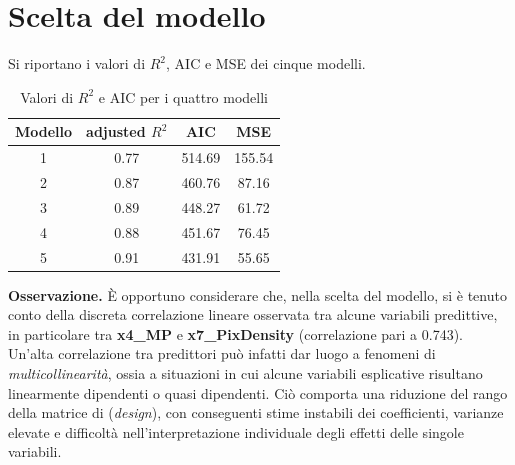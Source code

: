 \section{Scelta del modello}
Si riportano i valori di $R^2$, AIC e MSE dei cinque modelli.
\begin{table}[H]
	\centering
	\begin{tabular}{|c|c|c|c|}
		\hline
		\textbf{Modello} & \textbf{adjusted} \boldmath$R^2$ & \textbf{AIC} & \textbf{MSE}\\
		\hline
		1 &  0.77  & 514.69 & 155.54\\
		2 & 0.87 & 460.76 & 87.16\\
		3 & 0.89 & 448.27 & 61.72\\
		4 & 0.88 & 451.67 & 76.45\\
		5 & 0.91 & 431.91 & 55.65 \\
		\hline
	\end{tabular}
	\caption{Valori di $R^2$ e AIC per i quattro modelli}
\end{table}
\textbf{Osservazione.} È opportuno considerare che, nella scelta del modello, si è tenuto conto della discreta correlazione lineare osservata tra alcune variabili predittive, in particolare tra \textbf{x4\_MP} e \textbf{x7\_PixDensity} (correlazione pari a 0.743). \\ 
   Un’alta correlazione tra predittori può infatti dar luogo a fenomeni di \emph{multicollinearità}, ossia a situazioni in cui alcune variabili esplicative risultano linearmente dipendenti o quasi dipendenti. Ciò comporta una riduzione del rango della matrice di (\emph{design}), con conseguenti stime instabili dei coefficienti, varianze elevate e difficoltà nell’interpretazione individuale degli effetti delle singole variabili.
   
